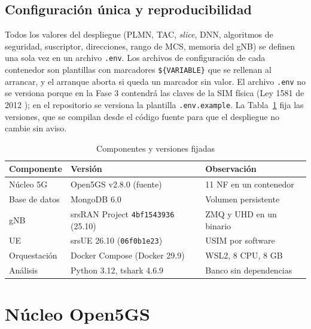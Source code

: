 \documentclass[conference]{IEEEtran}
\begin{document}
\subsection{Configuración única y reproducibilidad}
Todos los valores del despliegue (PLMN, TAC, \textit{slice}, DNN, algoritmos de seguridad, suscriptor, direcciones, rango de MCS, memoria del gNB) se definen una sola vez en un archivo \texttt{.env}. Los archivos de configuración de cada contenedor son plantillas con marcadores \texttt{\$\{VARIABLE\}} que se rellenan al arrancar, y el arranque aborta si queda un marcador sin valor. El archivo \texttt{.env} no se versiona porque en la Fase 3 contendrá las claves de la SIM física (Ley 1581 de 2012 \cite{ley1581}); en el repositorio se versiona la plantilla \texttt{.env.example}. La Tabla~\ref{tab:versiones} fija las versiones, que se compilan desde el código fuente para que el despliegue no cambie sin aviso.

\begin{table}[!t]
\caption{Componentes y versiones fijadas}
\label{tab:versiones}
\centering
\footnotesize
\renewcommand{\arraystretch}{1.12}
\begin{tabular}{p{1.7cm}p{3.5cm}p{2.5cm}}
\toprule
\textbf{Componente} & \textbf{Versión} & \textbf{Observación} \\
\midrule
Núcleo 5G & Open5GS v2.8.0 (fuente) & 11 NF en un contenedor \\
Base de datos & MongoDB 6.0 & Volumen persistente \\
gNB & srsRAN Project \texttt{4bf1543936} (25.10) & ZMQ y UHD en un binario \\
UE & srsUE 26.10 (\texttt{06f0b1e23}) & USIM por software \\
Orquestación & Docker Compose (Docker 29.9) & WSL2, 8 CPU, 8 GB \\
Análisis & Python 3.12, tshark 4.6.9 & Banco sin dependencias \\
\bottomrule
\end{tabular}
\end{table}

\section{Núcleo Open5GS}
\label{sec:core}
\end{document}
